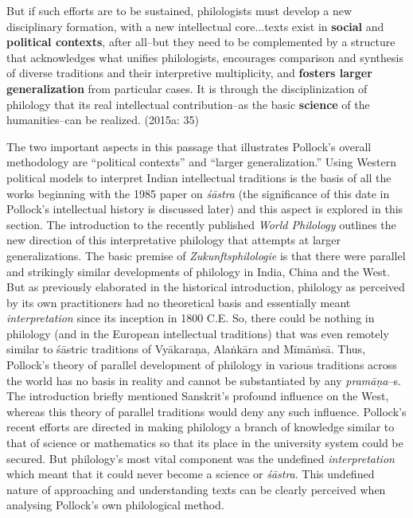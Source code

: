 \begin{myquote}
But if such efforts are to be sustained, philologists must develop a new disciplinary formation, with a new intellectual core...texts exist in \textbf{social} and \textbf{political contexts}, after all–but they need to be complemented by a structure that acknowledges what unifies philologists, encourages comparison and synthesis of diverse traditions and their interpretive multiplicity, and \textbf{fosters larger generalization} from particular cases. It is through the disciplinization of philology that its real intellectual contribution–as the basic \textbf{science} of the humanities–can be realized. (2015a: 35)
\end{myquote}

The two important aspects in this passage that illustrates Pollock’s overall methodology are “political contexts” and “larger generalization.” Using Western political models to interpret Indian intellectual traditions is the basis of all the works beginning with the 1985 paper on \textit{śāstra} (the significance of this date in Pollock’s intellectual history is discussed later) and this aspect is explored in this section. The introduction to the recently published \textit{World Philology} outlines the new direction of this interpretative philology that attempts at larger generalizations. The basic premise of \textit{Zukunftsphilologie} is that there were parallel and strikingly similar developments of philology in India, China and the West. But as previously elaborated in the historical introduction, philology as perceived by its own practitioners had no theoretical basis and essentially meant \textit{interpretation} since its inception in 1800 C.E. So, there could be nothing in philology (and in the European intellectual traditions) that was even remotely similar to śāstric traditions of Vyākaraṇa, Alaṅkāra and Mīmāṁsā. Thus, Pollock’s theory of parallel development of philology in various traditions across the world has no basis in reality and cannot be substantiated by any \textit{pramāṇa}–s. The introduction briefly mentioned Sanskrit’s profound influence on the West, whereas this theory of parallel traditions would deny any such influence. Pollock’s recent efforts are directed in making philology a branch of knowledge similar to that of science or mathematics so that its place in the university system could be secured. But philology’s most vital component was the undefined \textit{interpretation} which meant that it could never become a science or \textit{śāstra}. This undefined nature of approaching and understanding texts can be clearly perceived when analysing Pollock’s own philological method.

